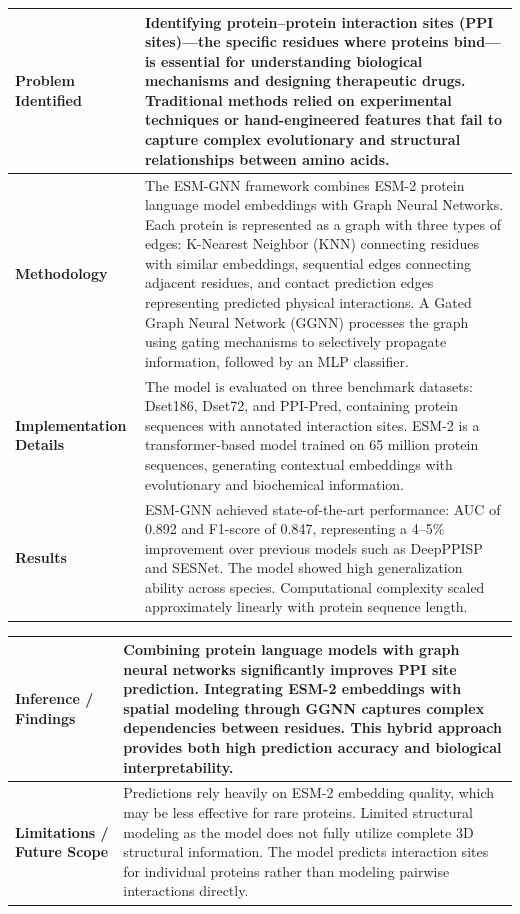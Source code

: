 \documentclass[12pt,a4paper]{report}
\begin{document}
\begin{table}[H]
\centering
\renewcommand{\arraystretch}{1.5}
\begin{tabular}{|p{}|p{}|}
\hline
\textbf{Problem Identified} & Identifying protein–protein interaction sites (PPI sites)---the specific residues where proteins bind---is essential for understanding biological mechanisms and designing therapeutic drugs. Traditional methods relied on experimental techniques or hand-engineered features that fail to capture complex evolutionary and structural relationships between amino acids. \\ \hline
\textbf{Methodology} & The ESM-GNN framework combines ESM-2 protein language model embeddings with Graph Neural Networks. Each protein is represented as a graph with three types of edges: K-Nearest Neighbor (KNN) connecting residues with similar embeddings, sequential edges connecting adjacent residues, and contact prediction edges representing predicted physical interactions. A Gated Graph Neural Network (GGNN) processes the graph using gating mechanisms to selectively propagate information, followed by an MLP classifier. \\ \hline
\textbf{Implementation Details} & The model is evaluated on three benchmark datasets: Dset186, Dset72, and PPI-Pred, containing protein sequences with annotated interaction sites. ESM-2 is a transformer-based model trained on 65 million protein sequences, generating contextual embeddings with evolutionary and biochemical information. \\ \hline
\textbf{Results} & ESM-GNN achieved state-of-the-art performance: AUC of 0.892 and F1-score of 0.847, representing a 4–5\% improvement over previous models such as DeepPPISP and SESNet. The model showed high generalization ability across species. Computational complexity scaled approximately linearly with protein sequence length. \\ \hline
\end{tabular}
\end{table}

\newpage

\begin{table}[H]
\centering
\renewcommand{\arraystretch}{1.5}
\begin{tabular}{|p{}|p{}|}
\hline
\textbf{Inference / Findings} & Combining protein language models with graph neural networks significantly improves PPI site prediction. Integrating ESM-2 embeddings with spatial modeling through GGNN captures complex dependencies between residues. This hybrid approach provides both high prediction accuracy and biological interpretability. \\ \hline
\textbf{Limitations / Future Scope} & Predictions rely heavily on ESM-2 embedding quality, which may be less effective for rare proteins. Limited structural modeling as the model does not fully utilize complete 3D structural information. The model predicts interaction sites for individual proteins rather than modeling pairwise interactions directly. \\ \hline
\end{tabular}
\end{table}
\end{document}
